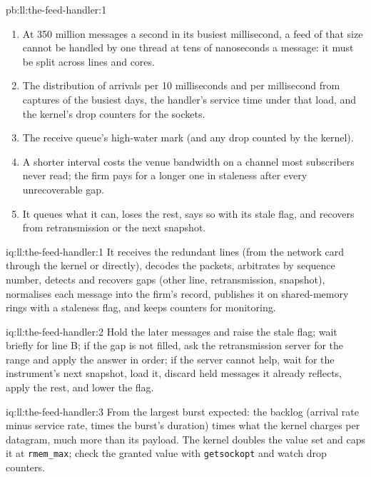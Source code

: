 \begin{solution}{pb:ll:the-feed-handler:1}
\begin{enumerate}
them duplicates discarded after a comparison.
\item At 350 million messages a second in its busiest millisecond, a feed of that size cannot be handled by one thread at tens
of nanoseconds a message: it must be split across lines and cores.
\item The distribution of arrivals per 10 milliseconds and per millisecond from captures of the busiest days, the handler's
service time under that load, and the kernel's drop counters for the sockets.
\item The receive queue's high-water mark (and any drop counted by the kernel).
\item A shorter interval costs the venue bandwidth on a channel most subscribers never read; the firm pays for a longer one in
staleness after every unrecoverable gap.
\item It queues what it can, loses the rest, says so with its stale flag, and recovers from retransmission or the next
snapshot.
\end{enumerate}
\end{solution}

\begin{solution}{iq:ll:the-feed-handler:1}
It receives the redundant lines (from the network card through the kernel or directly), decodes the packets, arbitrates by
sequence number, detects and recovers gaps (other line, retransmission, snapshot), normalises each message into the firm's
record, publishes it on shared-memory rings with a staleness flag, and keeps counters for monitoring.
\end{solution}

\begin{solution}{iq:ll:the-feed-handler:2}
Hold the later messages and raise the stale flag; wait briefly for line B; if the gap is not filled, ask the retransmission
server for the range and apply the answer in order; if the server cannot help, wait for the instrument's next snapshot, load
it, discard held messages it already reflects, apply the rest, and lower the flag.
\end{solution}

\begin{solution}{iq:ll:the-feed-handler:3}
From the largest burst expected: the backlog (arrival rate minus service rate, times the burst's duration) times what the kernel
charges per datagram, much more than its payload. The kernel doubles the value set and caps it at \texttt{rmem\_max};
check the granted value with \texttt{getsockopt} and watch drop counters.
\end{solution}

